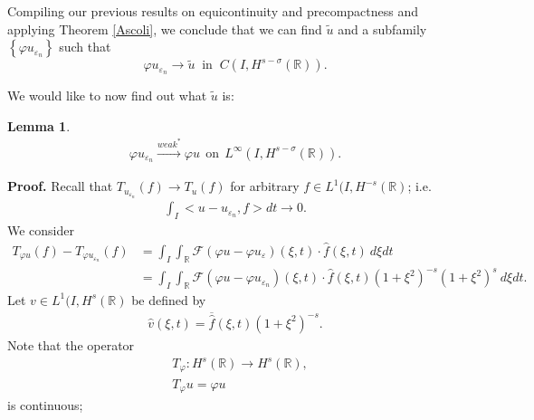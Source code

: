 \documentclass[12pt,reqno]{amsart}
\newcommand{\rr}{\mathbb{R}}
\newcommand{\ee}{\varepsilon}
\theoremstyle{plain}  %
\newtheorem{lemma}{Lemma}
\theoremstyle{definition}
\begin{document}
		Compiling our previous results on equicontinuity and precompactness
		and applying Theorem \ref{Ascoli}, we
		conclude that we can find $\tilde{u}$ and a subfamily $\left\{ \varphi
		u_{\ee_n}
		\right\}$ such that
		\begin{equation}
			\label{strong-conv-of-u_ep}
			\varphi u_{\ee_n} \to \tilde{u}
			\; \; \text{in} \; \; C(I, H^{s-\sigma}(\rr)).
		\end{equation}
		
		\vskip0.1in
		We would like to now find out what $\tilde{u}$ is:
		\vskip0.1in
		\begin{lemma}
			\label{lem:crit-conv}
			\begin{equation}
				\begin{split}
					\varphi u_{\ee_n} \xrightarrow{weak^*}
					\varphi u \ \ \text{on} \ \ L^\infty(I, H^{s-\sigma}(\rr)).
					\label{crit-conv-est}
				\end{split}
			\end{equation}
		\end{lemma}
		{\bf Proof.} 
		Recall that $T_{u_{\ee_n}}(f) \to T_u (f)$ for arbitrary $f \in
		L^1(I, H^{-s}(\rr)$; i.e.
		\begin{equation}
			\begin{split}
				\int_I <u - u_{\ee_n}, f> dt \to 0.
				\label{0aa}
			\end{split}
		\end{equation}
		We consider
		\begin{equation}
			\begin{split}
				T_{\varphi u}(f) - T_{\varphi u_{\ee_n}}(f)
				& = \int_I \int_\rr \mathcal{F}\left (\varphi u - \varphi
				u_\ee \right )(\xi, t) \cdot \widehat{f}(\xi, t) \ d \xi dt
				\\
				& = \int_I \int_\rr \mathcal{F}\left (\varphi u - \varphi
				u_{\ee_n} \right) (\xi, t) \cdot \widehat{f}(\xi, t)(1 + \xi^2)^{-s}
				(1+\xi^2)^s \ d \xi dt.
				\label{1aa}
			\end{split}
		\end{equation}
		Let $v \in L^1(I,H^s(\rr)$ be defined by 
		\begin{equation}
			\begin{split}
				\widehat{v}(\xi, t) = \overline{\widehat{f}} (\xi, t) (1 +
				\xi^2)^{-s}.
				\label{2aa}
			\end{split}
		\end{equation}
		Note that the operator 
		\begin{equation*}
			\begin{split}
			 & T_\varphi: H^s(\rr) \to H^s(\rr),
			 \\
		 	& T_\varphi u = \varphi u
		\end{split}
	\end{equation*} is continuous;
\end{document}
